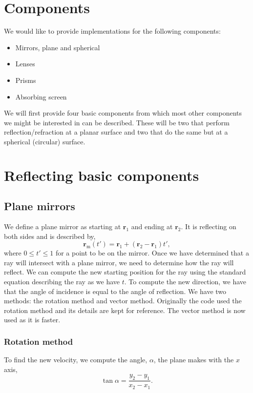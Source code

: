 \documentclass{article}
\let\vec \bm
\begin{document}
\section{Components}
We would like to provide implementations for the following components:
\begin{itemize}
    \item Mirrors, plane and spherical
    \item Lenses
    \item Prisms
    \item Absorbing screen
\end{itemize}
We will first provide four basic components from which most other components we might be interested in can be described. These will be two that perform reflection/refraction at a planar surface and two that do the same but at a spherical (circular) surface.

\section{Reflecting basic components}
\subsection{Plane mirrors}
We define a plane mirror as starting at $\vec{r}_1$ and ending at $\vec{r}_2$. It is reflecting on both sides and is described by,
\begin{equation}
    \vec{r}_\mathrm{m}(t')
    =
    \vec{r}_1 + (\vec{r}_2 - \vec{r}_1) t',
\end{equation}
where $0 \le t' \le 1$ for a point to be on the mirror. Once we have determined that a ray will intersect with a plane mirror, we need to determine how the ray will reflect. We can compute the new starting position for the ray using the standard equation describing the ray as we have $t$. To compute the new direction, we have that the angle of incidence is equal to the angle of reflection. We have two methods: the rotation method and vector method. Originally the code used the rotation method and its details are kept for reference. The vector method is now used as it is faster.

\subsubsection{Rotation method}
To find the new velocity, we compute the angle, $\alpha$, the plane makes with the $x$ axis,
\begin{equation}
    \label{eq:plane_angle}
    \tan \alpha
    =
    \frac{y_2 - y_1}{x_2 - x_1}.
\end{equation}
\end{document}
